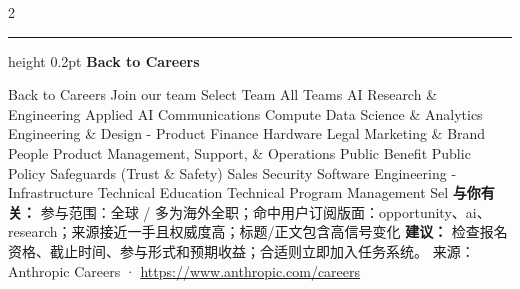\documentclass[10.5pt]{ctexart}
\begin{document}
\begin{multicols}{2}
\vspace{2mm}
\hrule height 0.2pt
\vspace{2mm}
{\large\bfseries Back to Careers}\par
Back to Careers Join our team Select Team All Teams AI Research \& Engineering Applied AI Communications Compute Data Science \& Analytics Engineering \& Design - Product Finance Hardware Legal Marketing \& Brand People Product Management, Support, \& Operations Public Benefit Public Policy Safeguards (Trust \& Safety) Sales Security Software Engineering - Infrastructure Technical Education Technical Program Management Sel
\textbf{与你有关：} 参与范围：全球 / 多为海外全职；命中用户订阅版面：opportunity、ai、research；来源接近一手且权威度高；标题/正文包含高信号变化
\textbf{建议：} 检查报名资格、截止时间、参与形式和预期收益；合适则立即加入任务系统。
{\footnotesize\color{ormuted} 来源：Anthropic Careers · \url{https://www.anthropic.com/careers}}
\end{multicols}
\end{document}
